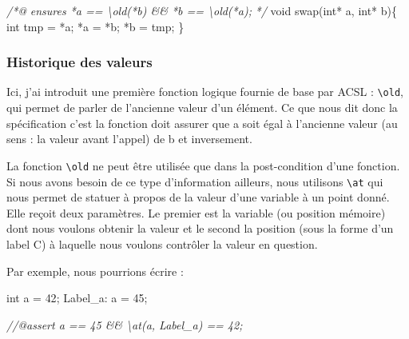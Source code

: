 \documentclass[12pt,francais,]{scrbook}
\newenvironment{Shaded}{}{}
\newcommand{\DataTypeTok}[1]{\textcolor[rgb]{0.56,0.13,0.00}{{#1}}}
\newcommand{\DecValTok}[1]{\textcolor[rgb]{0.25,0.63,0.44}{{#1}}}
\newcommand{\CommentTok}[1]{\textcolor[rgb]{0.38,0.63,0.69}{\textit{{#1}}}}
\newcommand{\NormalTok}[1]{{#1}}
\begin{document}
\begin{footnotesize}\begin{Shaded}
\begin{Highlighting}[]
\CommentTok{/*@}
\CommentTok{  ensures *a == \textbackslash{}old(*b) && *b == \textbackslash{}old(*a);}
\CommentTok{*/}
\DataTypeTok{void} \NormalTok{swap(}\DataTypeTok{int}\NormalTok{* a, }\DataTypeTok{int}\NormalTok{* b)\{}
  \DataTypeTok{int} \NormalTok{tmp = *a;}
  \NormalTok{*a = *b;}
  \NormalTok{*b = tmp;}
\NormalTok{\}}
\end{Highlighting}
\end{Shaded}\end{footnotesize}

\subsubsection{Historique des valeurs}\label{historique-des-valeurs}

Ici, j'ai introduit une première fonction logique fournie de base par
ACSL : \texttt{\textbackslash{}old}, qui permet de parler de l'ancienne
valeur d'un élément. Ce que nous dit donc la spécification c'est \og{}la
fonction doit assurer que a soit égal à l'ancienne valeur (au sens : la
valeur avant l'appel) de b et inversement\fg{}.

La fonction \texttt{\textbackslash{}old} ne peut être utilisée que dans
la post-condition d'une fonction. Si nous avons besoin de ce type
d'information ailleurs, nous utilisons \texttt{\textbackslash{}at} qui
nous permet de statuer à propos de la valeur d'une variable à un point
donné. Elle reçoit deux paramètres. Le premier est la variable (ou
position mémoire) dont nous voulons obtenir la valeur et le second la
position (sous la forme d'un label C) à laquelle nous voulons contrôler
la valeur en question.

Par exemple, nous pourrions écrire :

\begin{footnotesize}\begin{Shaded}
\begin{Highlighting}[]
  \DataTypeTok{int} \NormalTok{a = }\DecValTok{42}\NormalTok{;}
 \NormalTok{Label_a:}
  \NormalTok{a = }\DecValTok{45}\NormalTok{;}

  \CommentTok{//@assert a == 45 && \textbackslash{}at(a, Label_a) == 42;}
\end{Highlighting}
\end{Shaded}\end{footnotesize}
\end{document}
